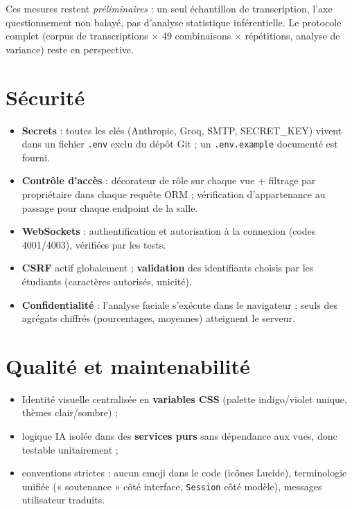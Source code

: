 \documentclass[12pt,a4paper]{report}
\begin{document}
Ces mesures restent \emph{préliminaires} : un seul échantillon de
transcription, l'axe questionnement non balayé, pas d'analyse statistique
inférentielle. Le protocole complet (corpus de transcriptions $\times$ 49
combinaisons $\times$ répétitions, analyse de variance) reste en perspective.

\section{Sécurité}

\begin{itemize}
  \item \textbf{Secrets} : toutes les clés (Anthropic, Groq, SMTP, SECRET\_KEY)
        vivent dans un fichier \texttt{.env} exclu du dépôt Git ; un
        \texttt{.env.example} documenté est fourni.
  \item \textbf{Contrôle d'accès} : décorateur de rôle sur chaque vue +
        filtrage par propriétaire dans chaque requête ORM ; vérification
        d'appartenance au passage pour chaque endpoint de la salle.
  \item \textbf{WebSockets} : authentification et autorisation à la connexion
        (codes 4001/4003), vérifiées par les tests.
  \item \textbf{CSRF} actif globalement ; \textbf{validation} des identifiants
        choisis par les étudiants (caractères autorisés, unicité).
  \item \textbf{Confidentialité} : l'analyse faciale s'exécute dans le
        navigateur ; seuls des agrégats chiffrés (pourcentages, moyennes)
        atteignent le serveur.
\end{itemize}

\section{Qualité et maintenabilité}

\begin{itemize}
  \item Identité visuelle centralisée en \textbf{variables CSS} (palette
        indigo/violet unique, thèmes clair/sombre) ;
  \item logique IA isolée dans des \textbf{services purs} sans dépendance aux
        vues, donc testable unitairement ;
  \item conventions strictes : aucun emoji dans le code (icônes Lucide),
        terminologie unifiée (« soutenance » côté interface, \texttt{Session}
        côté modèle), messages utilisateur traduits.
\end{itemize}
\end{document}

